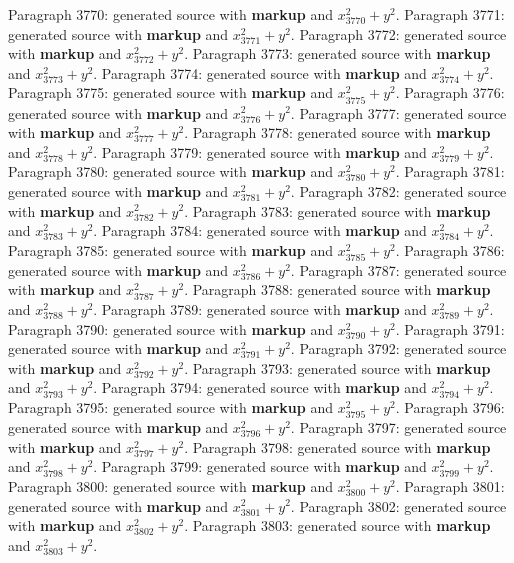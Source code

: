 \documentclass{article}
\begin{document}
Paragraph 3770: generated source with \textbf{markup} and $x_{3770}^2 + y^2$.
Paragraph 3771: generated source with \textbf{markup} and $x_{3771}^2 + y^2$.
Paragraph 3772: generated source with \textbf{markup} and $x_{3772}^2 + y^2$.
Paragraph 3773: generated source with \textbf{markup} and $x_{3773}^2 + y^2$.
Paragraph 3774: generated source with \textbf{markup} and $x_{3774}^2 + y^2$.
Paragraph 3775: generated source with \textbf{markup} and $x_{3775}^2 + y^2$.
Paragraph 3776: generated source with \textbf{markup} and $x_{3776}^2 + y^2$.
Paragraph 3777: generated source with \textbf{markup} and $x_{3777}^2 + y^2$.
Paragraph 3778: generated source with \textbf{markup} and $x_{3778}^2 + y^2$.
Paragraph 3779: generated source with \textbf{markup} and $x_{3779}^2 + y^2$.
Paragraph 3780: generated source with \textbf{markup} and $x_{3780}^2 + y^2$.
Paragraph 3781: generated source with \textbf{markup} and $x_{3781}^2 + y^2$.
Paragraph 3782: generated source with \textbf{markup} and $x_{3782}^2 + y^2$.
Paragraph 3783: generated source with \textbf{markup} and $x_{3783}^2 + y^2$.
Paragraph 3784: generated source with \textbf{markup} and $x_{3784}^2 + y^2$.
Paragraph 3785: generated source with \textbf{markup} and $x_{3785}^2 + y^2$.
Paragraph 3786: generated source with \textbf{markup} and $x_{3786}^2 + y^2$.
Paragraph 3787: generated source with \textbf{markup} and $x_{3787}^2 + y^2$.
Paragraph 3788: generated source with \textbf{markup} and $x_{3788}^2 + y^2$.
Paragraph 3789: generated source with \textbf{markup} and $x_{3789}^2 + y^2$.
Paragraph 3790: generated source with \textbf{markup} and $x_{3790}^2 + y^2$.
Paragraph 3791: generated source with \textbf{markup} and $x_{3791}^2 + y^2$.
Paragraph 3792: generated source with \textbf{markup} and $x_{3792}^2 + y^2$.
Paragraph 3793: generated source with \textbf{markup} and $x_{3793}^2 + y^2$.
Paragraph 3794: generated source with \textbf{markup} and $x_{3794}^2 + y^2$.
Paragraph 3795: generated source with \textbf{markup} and $x_{3795}^2 + y^2$.
Paragraph 3796: generated source with \textbf{markup} and $x_{3796}^2 + y^2$.
Paragraph 3797: generated source with \textbf{markup} and $x_{3797}^2 + y^2$.
Paragraph 3798: generated source with \textbf{markup} and $x_{3798}^2 + y^2$.
Paragraph 3799: generated source with \textbf{markup} and $x_{3799}^2 + y^2$.
Paragraph 3800: generated source with \textbf{markup} and $x_{3800}^2 + y^2$.
Paragraph 3801: generated source with \textbf{markup} and $x_{3801}^2 + y^2$.
Paragraph 3802: generated source with \textbf{markup} and $x_{3802}^2 + y^2$.
Paragraph 3803: generated source with \textbf{markup} and $x_{3803}^2 + y^2$.
\end{document}

